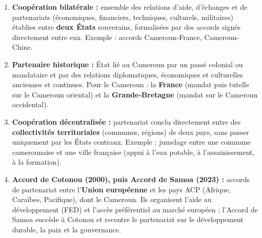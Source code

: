 \documentclass[11pt]{article}
\begin{document}
\begin{corrige}
\begin{enumerate}
\item \textbf{Coopération bilatérale :} ensemble des relations d'aide, d'échanges et de partenariats (économiques, financiers, techniques, culturels, militaires) établies entre \textbf{deux États} souverains, formalisées par des accords signés directement entre eux. Exemple : accords Cameroun-France, Cameroun-Chine.
\item \textbf{Partenaire historique :} État lié au Cameroun par un passé colonial ou mandataire et par des relations diplomatiques, économiques et culturelles anciennes et continues. Pour le Cameroun : la \textbf{France} (mandat puis tutelle sur le Cameroun oriental) et la \textbf{Grande-Bretagne} (mandat sur le Cameroun occidental).
\item \textbf{Coopération décentralisée :} partenariat conclu directement entre des \textbf{collectivités territoriales} (communes, régions) de deux pays, sans passer uniquement par les États centraux. Exemple : jumelage entre une commune camerounaise et une ville française (appui à l'eau potable, à l'assainissement, à la formation).
\item \textbf{Accord de Cotonou (2000), puis Accord de Samoa (2023) :} accords de partenariat entre l'\textbf{Union européenne} et les pays ACP (Afrique, Caraïbes, Pacifique), dont le Cameroun. Ils organisent l'aide au développement (FED) et l'accès préférentiel au marché européen ; l'Accord de Samoa succède à Cotonou et recentre le partenariat sur le développement durable, la paix et la gouvernance.
\end{enumerate}
\end{corrige}
\end{document}
